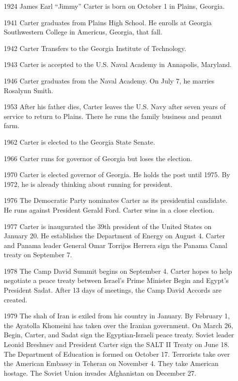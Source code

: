 \documentclass{article}
\begin{document}
\begin{itemize}
\item[1924] James Earl ``Jimmy'' Carter is born on October 1 in Plains, Georgia.

\item[1941] Carter graduates from Plains High School. He enrolls at Georgia Southwestern College in Americus, Georgia, that fall.

\item[1942] Carter Transfers to the Georgia Institute of Technology.

\item[1943] Carter is accepted to the U.S. Naval Academy in Annapolis, Maryland.

\item[1946] Carter graduates from the Naval Academy. On July 7, he marries Rosalynn Smith.

\item[1953] After his father dies, Carter leaves the U.S. Navy after seven years of service to return to Plains. There he runs the family business and peanut farm.

\item[1962] Carter is elected to the Georgia State Senate.

\item[1966] Carter runs for governor of Georgia but loses the election.

\item[1970] Carter is elected governor of Georgia. He holds the post until 1975. By 1972, he is already thinking about running for president.

\item[1976] The Democratic Party nominates Carter as its presidential candidate. He runs against President Gerald Ford. Carter wins in a close election.

\item[1977] Carter is inaugurated the 39th president of the United States on January 20. He establishes the Department of Energy on August 4. Carter and Panama leader General Omar Torrijos Herrera sign the Panama Canal treaty on September 7.

\item[1978] The Camp David Summit begins on September 4. Carter hopes to help negotiate a peace treaty between Israel's Prime Minister Begin and Egypt's President Sadat. After 13 days of meetings, the Camp David Accords are created.

\item[1979] The shah of Iran is exiled from his country in January. By February 1, the Ayatolla Khomeini has taken over the Iranian government. On March 26, Begin, Carter, and Sadat sign the Egyptian-Israeli peace treaty. Soviet leader Leonid Breshnev and President Carter sign the SALT II Treaty on June 18. The Department of Education is formed on October 17. Terrorists take over the American Embassy in Teheran on November 4. They take American hostage. The Soviet Union invades Afghanistan on December 27.


\end{itemize}
\end{document}
